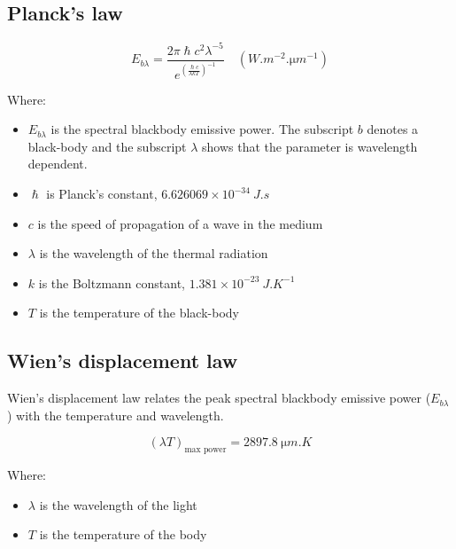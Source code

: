 \documentclass[11pt]{article}
\begin{document}
 \newpage

\subsection{Planck's law}
\label{sec:org1cb9215}
\[E_{b \lambda} = \frac{2 \pi \hslash c^2 \lambda^{-5}}{e^{\left(\frac{\hslash c}{\lambda k T} \right)^{-1}}} \quad (\unit{W.m^{-2}.\micro m^{-1}})\]

Where:
\begin{itemize}
\item \(E_{b \lambda}\) is the spectral blackbody emissive power. The subscript \(b\) denotes a black-body and the subscript \(\lambda\) shows that the parameter is wavelength dependent.
\item \(\hslash\) is Planck's constant, \(6.626069 \times 10^{-34} \ \unit{J.s}\)
\item \(c\) is the speed of propagation of a wave in the medium
\item \(\lambda\) is the wavelength of the thermal radiation
\item \(k\) is the Boltzmann constant, \(1.381 \times 10^{-23} \ \unit{J.K^{-1}}\)
\item \(T\) is the temperature of the black-body
\end{itemize}

\subsection{Wien's displacement law}
\label{sec:org2b8e47b}
Wien's displacement law relates the peak spectral blackbody emissive power (\(E_{b \lambda}\)) with the temperature and wavelength.

\[(\lambda T)_{\text{max power}} = \qty{2897.8}{\micro m.K}\]

Where:
\begin{itemize}
\item \(\lambda\) is the wavelength of the light
\item \(T\) is the temperature of the body
\end{itemize}
\end{document}
